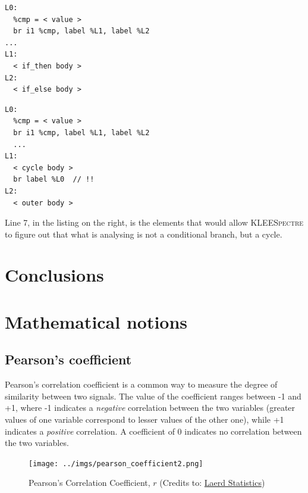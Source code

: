 \documentclass[12pt,a4paper]{book}
\theoremstyle{definition}
\begin{document}
	\begin{minipage}{0.47\textwidth}
	\begin{lstlisting}[caption={LLVM bitcode fragment a conditional branch\vspace{2mm}}]
L0:	
  %cmp = < value >
  br i1 %cmp, label %L1, label %L2
...
L1:
  < if_then body >
L2:
  < if_else body >
	\end{lstlisting}
	\end{minipage}\hfill
	\begin{minipage}{0.47\textwidth}
	\begin{lstlisting}[caption={LLVM bitcode fragment encoding a cycle\vspace{2mm}}]
L0:
  %cmp = < value >
  br i1 %cmp, label %L1, label %L2
  ...
L1:
  < cycle body >
  br label %L0	// !!
L2:
  < outer body >
	\end{lstlisting}
	\end{minipage}
	\vspace{3mm}
	
	Line 7, in the listing on the right, is the elements that would allow \textsc{KLEESpectre} to figure out that what is analysing is not a conditional branch, but a cycle.

	\chapter{Conclusions}\label{conclusions}
	
	\appendix
	
	\chapter{Mathematical notions}\label{appendix:maths}
	\section{Pearson's coefficient}
	Pearson's correlation coefficient \cite{Pearson1895} is a common way to measure the degree of similarity between two signals. The value of the coefficient ranges between -1 and +1, where -1 indicates a \textit{negative} correlation between the two variables (greater values of one variable correspond to lesser values of the other one), while +1 indicates a \textit{positive} correlation. A coefficient of 0 indicates no correlation between the two variables.	
	\begin{figure}[h!]
		\centering
		\texttt{[image: ../imgs/pearson\_coefficient2.png]}
		\caption{Pearson's Correlation Coefficient, $r$ (Credits to: \href{https://statistics.laerd.com/statistical-guides/pearson-correlation-coefficient-statistical-guide.php}{Laerd Statistics})}
		\label{fig:pearson2}
	\end{figure}
	
\end{document}
